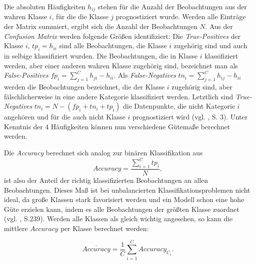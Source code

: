 \documentclass[a4paper,11pt]{article}
\begin{document}
Die absoluten Häufigkeiten $h_{ij}$ stehen für die Anzahl der Beobachtungen aus der wahren Klasse $i$, für die die Klasse $j$ prognostiziert wurde. Werden alle Einträge der Matrix summiert, ergibt sich die Anzahl der Beobachtungen $N$. Aus der \textit{Confusion Matrix} werden folgende Größen identifiziert: Die \textit{True-Positives} der Klasse $i$, $tp_i = h_{ii}$ sind alle Beobachtungen, die Klasse $i$ zugehörig sind und auch in selbige klassifiziert wurden. Die Beobachtungen, die in Klasse $i$ klassifiziert werden, aber einer anderen wahren Klasse zugehörig sind, bezeichnet man als \textit{False-Positives} $fp_i = \sum_{j = 1}^C h_{ji} - h_{ii}$. Als \textit{False-Negatives} $tn_i = \sum_{j = 1}^C h_{ij} - h_{ii}$ werden die Beobachtungen bezeichnet, die der Klasse $i$ zugehörig sind, aber fälschlicherweise in eine andere Kategorie klassifiziert werden. Letztlich sind \textit{True-Negatives} $tn_i = N - (fp_i + tn_i + tp_i)$ die Datenpunkte, die nicht Kategorie $i$ angehören und für die auch nicht Klasse $i$ prognostiziert wird (vgl. \cite{sokolova}, S. 3). Unter Kenntnis der $4$ Häufigkeiten können nun verschiedene Gütemaße berechnet werden. 


Die \textit{Accuracy} berechnet sich analog zur binären Klassifikation aus 
\[ Accuracy = \frac{\sum_{i=1}^C tp_i}{N},  \]
ist also der Anteil der richtig klassifizierten Beobachtungen an allen Beobachtungen. Dieses Maß ist bei unbalancierten Klassifikationsproblemen nicht ideal, da große Klassen stark favorisiert werden und ein Modell schon eine hohe Güte erzielen kann, indem es alle Beobachtungen der größten Klasse zuordnet (vgl. \cite{backhaus}, S.239). Werden alle Klassen als gleich wichtig angesehen, so kann die mittlere $Accuracy$ per Klasse berechnet werden: 

\[\overline{Accuracy} = \frac{1}{C} \sum_{i = 1}^C Accuracy_{C_i} .\]
\end{document}
